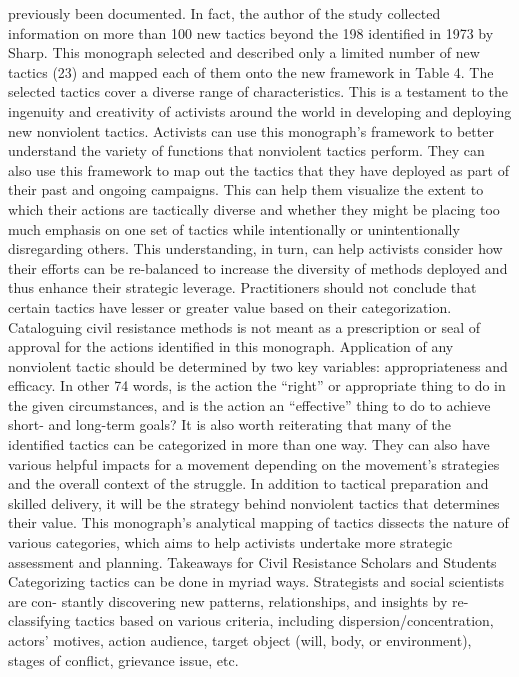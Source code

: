 \documentclass[twoside,a4paper,12pt,fleqn,openany]{extbook}
\begin{document}
previously been documented. In fact, the author of the study collected information on more
than 100 new tactics beyond the 198 identified in 1973 by Sharp.
This monograph selected and described only a limited number of new tactics (23) and
mapped each of them onto the new framework in Table 4. The selected tactics cover a diverse
range of characteristics. This is a testament to the ingenuity and creativity of activists around
the world in developing and deploying new nonviolent tactics.
Activists can use this monograph’s framework to better understand the variety of functions
that nonviolent tactics perform. They can also use this framework to map out the tactics that
they have deployed as part of their past and ongoing campaigns. This can help them visualize
the extent to which their actions are tactically diverse and whether they might be placing too
much emphasis on one set of tactics while intentionally or unintentionally disregarding others.
This understanding, in turn, can help activists consider how their efforts can be re-balanced
to increase the diversity of methods deployed and thus enhance their strategic leverage.
Practitioners should not conclude that certain tactics have lesser or greater value based
on their categorization. Cataloguing civil resistance methods is not meant as a prescription
or seal of approval for the actions identified in this monograph. Application of any nonviolent
tactic should be determined by two key variables: appropriateness and efficacy. In other
74
words, is the action the “right” or appropriate thing to do in the given circumstances, and is
the action an “effective” thing to do to achieve short- and long-term goals?
It is also worth reiterating that many of the identified tactics can be categorized in more
than one way. They can also have various helpful impacts for a movement depending on the
movement’s strategies and the overall context of the struggle. In addition to tactical preparation
and skilled delivery, it will be the strategy behind nonviolent tactics that determines their value.
This monograph’s analytical mapping of tactics dissects the nature of various categories, which
aims to help activists undertake more strategic assessment and planning.
Takeaways for Civil Resistance Scholars and Students
Categorizing tactics can be done in myriad ways. Strategists and social scientists are con-
stantly discovering new patterns, relationships, and insights by re-classifying tactics based
on various criteria, including dispersion/concentration, actors’ motives, action audience, target
object (will, body, or environment), stages of conflict, grievance issue, etc.
\end{document}
